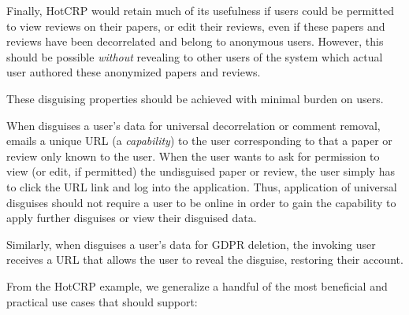 Finally, HotCRP would retain much of its usefulness if users could be permitted to view reviews on
their papers, or edit their reviews, even if these papers and reviews have been decorrelated and
belong to anonymous users.  However, this should be possible \emph{without} revealing to other users
of the system which actual user authored these anonymized papers and reviews.

 These disguising properties should be achieved with minimal burden on
users. 

When \sys disguises a user's data for universal decorrelation or comment removal, \sys emails a
unique URL (a \emph{capability}) to the user corresponding to that a paper or review only known to
the user. When the user wants to ask for permission to view (or edit, if permitted) the undisguised
paper or review, the user simply has to click the URL link and log into the application. Thus,
application of universal disguises should not require a user to be online in order to gain the
capability to apply further disguises or view their disguised data.

Similarly, when \sys disguises a user's data for GDPR deletion, the invoking user receives a URL
that allows the user to reveal the disguise, restoring their account.

From the HotCRP example, we generalize a handful of the most beneficial and practical use cases
that \sys should support:


